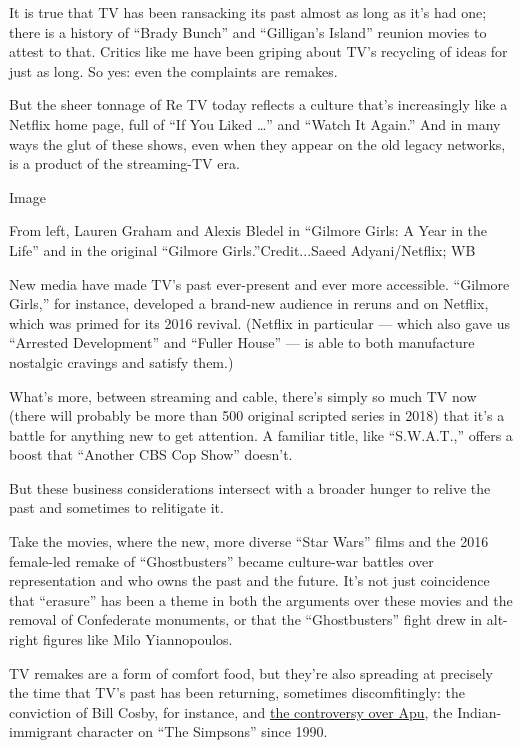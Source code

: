 It is true that TV has been ransacking its past almost as long as it's
had one; there is a history of ``Brady Bunch'' and ``Gilligan's Island''
reunion movies to attest to that. Critics like me have been griping
about TV's recycling of ideas for just as long. So yes: even the
complaints are remakes.

But the sheer tonnage of Re TV today reflects a culture that's
increasingly like a Netflix home page, full of ``If You Liked \ldots''
and ``Watch It Again.'' And in many ways the glut of these shows, even
when they appear on the old legacy networks, is a product of the
streaming-TV era.

Image

From left, Lauren Graham and Alexis Bledel in ``Gilmore Girls: A Year in
the Life'' and in the original ``Gilmore Girls.''Credit...Saeed
Adyani/Netflix; WB

New media have made TV's past ever-present and ever more accessible.
``Gilmore Girls,'' for instance, developed a brand-new audience in
reruns and on Netflix, which was primed for its 2016 revival. (Netflix
in particular --- which also gave us ``Arrested Development'' and
``Fuller House'' --- is able to both manufacture nostalgic cravings and
satisfy them.)

What's more, between streaming and cable, there's simply so much TV now
(there will probably be more than 500 original scripted series in 2018)
that it's a battle for anything new to get attention. A familiar title,
like ``S.W.A.T.,'' offers a boost that ``Another CBS Cop Show'' doesn't.

But these business considerations intersect with a broader hunger to
relive the past and sometimes to relitigate it.

Take the movies, where the new, more diverse ``Star Wars'' films and the
2016 female-led remake of ``Ghostbusters'' became culture-war battles
over representation and who owns the past and the future. It's not just
coincidence that ``erasure'' has been a theme in both the arguments over
these movies and the removal of Confederate monuments, or that the
``Ghostbusters'' fight drew in alt-right figures like Milo Yiannopoulos.

TV remakes are a form of comfort food, but they're also spreading at
precisely the time that TV's past has been returning, sometimes
discomfitingly: the conviction of Bill Cosby, for instance, and
\href{https://www.nytimes.com/2018/04/29/opinion/simpsons-apu-brownface.html}{the
controversy over Apu}, the Indian-immigrant character on ``The
Simpsons'' since 1990.

